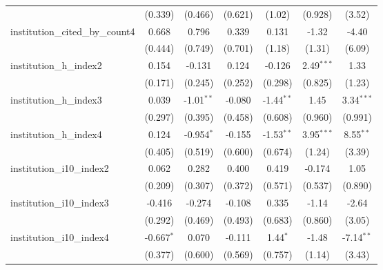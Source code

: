 \begin{tabular}{lcccccc}
                                         & (0.339)       & (0.466)       & (0.621)       & (1.02)        & (0.928)      & (3.52)\\   
   institution\_cited\_by\_count4        & 0.668         & 0.796         & 0.339         & 0.131         & -1.32        & -4.40\\   
                                         & (0.444)       & (0.749)       & (0.701)       & (1.18)        & (1.31)       & (6.09)\\   
   institution\_h\_index2                & 0.154         & -0.131        & 0.124         & -0.126        & 2.49$^{***}$ & 1.33\\   
                                         & (0.171)       & (0.245)       & (0.252)       & (0.298)       & (0.825)      & (1.23)\\   
   institution\_h\_index3                & 0.039         & -1.01$^{**}$  & -0.080        & -1.44$^{**}$  & 1.45         & 3.34$^{***}$\\   
                                         & (0.297)       & (0.395)       & (0.458)       & (0.608)       & (0.960)      & (0.991)\\   
   institution\_h\_index4                & 0.124         & -0.954$^{*}$  & -0.155        & -1.53$^{**}$  & 3.95$^{***}$ & 8.55$^{**}$\\   
                                         & (0.405)       & (0.519)       & (0.600)       & (0.674)       & (1.24)       & (3.39)\\   
   institution\_i10\_index2              & 0.062         & 0.282         & 0.400         & 0.419         & -0.174       & 1.05\\   
                                         & (0.209)       & (0.307)       & (0.372)       & (0.571)       & (0.537)      & (0.890)\\   
   institution\_i10\_index3              & -0.416        & -0.274        & -0.108        & 0.335         & -1.14        & -2.64\\   
                                         & (0.292)       & (0.469)       & (0.493)       & (0.683)       & (0.860)      & (3.05)\\   
   institution\_i10\_index4              & -0.667$^{*}$  & 0.070         & -0.111        & 1.44$^{*}$    & -1.48        & -7.14$^{**}$\\   
                                         & (0.377)       & (0.600)       & (0.569)       & (0.757)       & (1.14)       & (3.43)\\   

\end{tabular}
